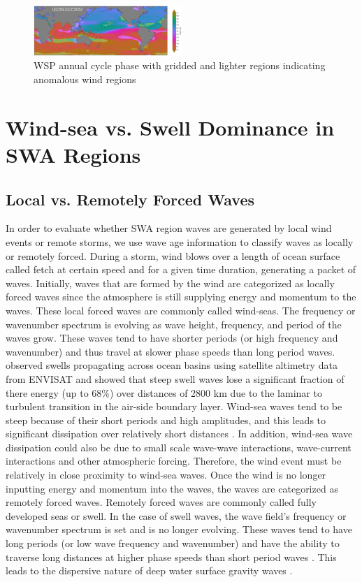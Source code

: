 \documentclass[draft,linenumbers]{agujournal2018}
\begin{document}
 \begin{figure}[tbh]
\centering
\includegraphics[width=0.5\textwidth]{figs/supplemental_figs/partitioned_ocean_anomaly.png}
\caption{WSP annual cycle phase with gridded and lighter regions indicating anomalous wind regions}
\label{frac_wsp_anomaly}
\end{figure}


\section{Wind-sea vs. Swell Dominance in SWA Regions}

\subsection{Local vs. Remotely Forced Waves}

In order to evaluate whether SWA region waves are generated by local wind events or remote storms, we use wave age information to classify waves as locally or remotely forced. During a storm, wind blows over a length of ocean surface called fetch at certain speed and for a given time duration, generating a packet of waves. Initially, waves that are formed by the wind are categorized as locally forced waves since the atmosphere is still supplying energy and momentum to the waves. These local forced waves are commonly called wind-seas. The frequency or wavenumber spectrum is evolving as wave height, frequency, and period of the waves grow. These waves tend to have shorter periods (or high frequency and wavenumber) and thus travel at slower phase speeds than long period waves. \citet{ardhuin2009observation} observed swells propagating across ocean basins using satellite altimetry data from ENVISAT and showed that steep swell waves lose a significant fraction of there energy (up to 68\%) over distances of 2800 km due to the laminar to turbulent transition in the air-side boundary layer. Wind-sea waves tend to be steep because of their short periods and high amplitudes, and this leads to significant dissipation over relatively short distances \cite{ardhuin2009observation}. In addition, wind-sea wave dissipation could also be due to small scale wave-wave interactions, wave-current interactions and other atmospheric forcing. Therefore, the wind event must be relatively in close proximity to wind-sea waves. Once the wind is no longer inputting energy and momentum into the waves, the waves are categorized as remotely forced waves. Remotely forced waves are commonly called fully developed seas or swell. In the case of swell waves, the wave field's frequency or wavenumber spectrum is set and is no longer evolving. These waves tend to have long periods (or low wave frequency and wavenumber) and have the ability to traverse long distances at higher phase speeds than short period waves \cite{snodgrass1966propagation}. This leads to the dispersive nature of deep water surface gravity waves \cite{snodgrass1966propagation}.   
\end{document}
